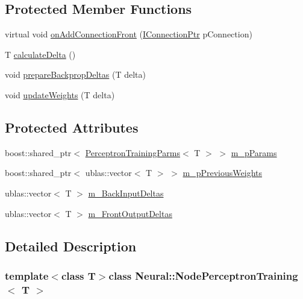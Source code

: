 \subsection*{Protected Member Functions}
\begin{DoxyCompactItemize}
\item 
virtual void \hyperlink{class_neural_1_1_node_perceptron_training_aaae9cd584f19ab3a70b5ab1ba90b29c2}{onAddConnectionFront} (\hyperlink{class_neural_1_1_i_node_a5243be0a422bcddc5a71a79920d09fd1}{IConnectionPtr} pConnection)
\item 
T \hyperlink{class_neural_1_1_node_perceptron_training_a7068fdc1c0648c631696a76f4d3dd589}{calculateDelta} ()
\item 
void \hyperlink{class_neural_1_1_node_perceptron_training_a5128e41cd82bac27b65ad8dd6b077623}{prepareBackpropDeltas} (T delta)
\item 
void \hyperlink{class_neural_1_1_node_perceptron_training_a4a723d0a265f18392edb3efa3a664562}{updateWeights} (T delta)
\end{DoxyCompactItemize}
\subsection*{Protected Attributes}
\begin{DoxyCompactItemize}
\item 
boost::shared\_\-ptr$<$ \hyperlink{class_neural_1_1_perceptron_training_parms}{PerceptronTrainingParms}$<$ T $>$ $>$ \hyperlink{class_neural_1_1_node_perceptron_training_a342301971ab0a2817f0bebe2dbe002b4}{m\_\-pParams}
\item 
boost::shared\_\-ptr$<$ ublas::vector$<$ T $>$ $>$ \hyperlink{class_neural_1_1_node_perceptron_training_ae97af6f6af980d423607e1ad69847216}{m\_\-pPreviousWeights}
\item 
ublas::vector$<$ T $>$ \hyperlink{class_neural_1_1_node_perceptron_training_a0716f11bf1c185a591ad1ac5e095bc6a}{m\_\-BackInputDeltas}
\item 
ublas::vector$<$ T $>$ \hyperlink{class_neural_1_1_node_perceptron_training_a91c47cf8e1f254a72568d0d7988b77d9}{m\_\-FrontOutputDeltas}
\end{DoxyCompactItemize}


\subsection{Detailed Description}
\subsubsection*{template$<$class T$>$class Neural::NodePerceptronTraining$<$ T $>$}



